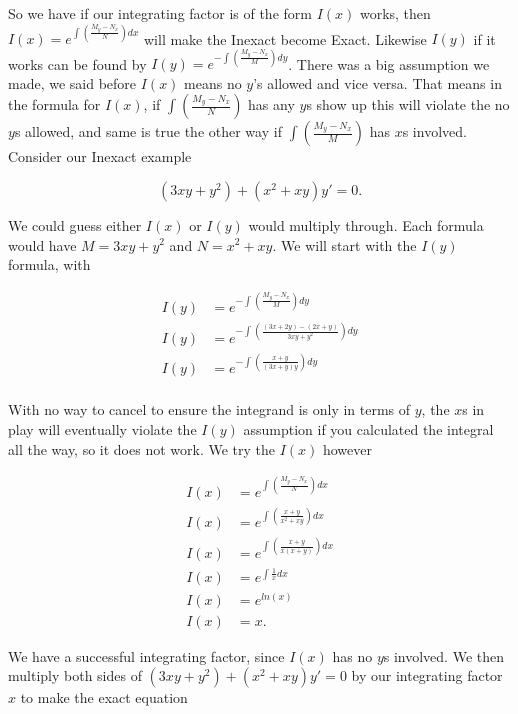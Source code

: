\documentclass[12pt]{article}
\begin{document}
So we have if our integrating factor is of the form $I(x)$ works, then $I(x)=e^{\int\left(\frac{M_y-N_x}{N}\right) dx}$ will make the Inexact become Exact. Likewise $I(y)$ if it works can be found by $I(y)=e^{-\int\left(\frac{M_y-N_x}{M}\right) dy}$. There was a big assumption we made, we said before $I(x)$ means no $y$'s allowed and vice versa. That means in the formula for $I(x)$, if $\int\left(\frac{M_y-N_x}{N}\right)$ has any $y$s show up this will violate the no $y$s allowed, and same is true the other way if $\int\left(\frac{M_y-N_x}{M}\right)$ has $x$s involved. \\

Consider our Inexact example

\begin{equation*}
    (3xy+y^2) + (x^2+xy)y'=0.
\end{equation*}

We could guess either $I(x)$ or $I(y)$ would multiply through. Each formula would have $M=3xy+y^2$ and $N=x^2+xy$. We will start with the $I(y)$ formula, with

\begin{align*}
    I(y) &= e^{-\int\left(\frac{M_y-N_x}{M}\right) dy} \\
    I(y) &= e^{-\int\left(\frac{(3x+2y)-(2x+y)}{3xy+y^2}\right) dy} \\
    I(y) &= e^{-\int\left(\frac{x+y}{(3x+y)y}\right) dy} \\
\end{align*}

With no way to cancel to ensure the integrand is only in terms of $y$, the $x$s in play will eventually violate the $I(y)$ assumption if you calculated the integral all the way, so it does not work. We try the $I(x)$ however

\begin{align*}
    I(x) &=e^{\int\left(\frac{M_y-N_x}{N}\right) dx} \\
    I(x) &=e^{\int\left(\frac{x+y}{x^2+xy}\right) dx} \\
    I(x) &=e^{\int\left(\frac{x+y}{x(x+y)}\right) dx} \\
    I(x) &=e^{\int\frac{1}{x} dx} \\
    I(x) &=e^{ln(x)} \\
    I(x) &= x.
\end{align*}

We have a successful integrating factor, since $I(x)$ has no $y$s involved. We then multiply both sides of $(3xy+y^2) + (x^2+xy)y'=0$ by our integrating factor $x$ to make the exact equation
\end{document}
